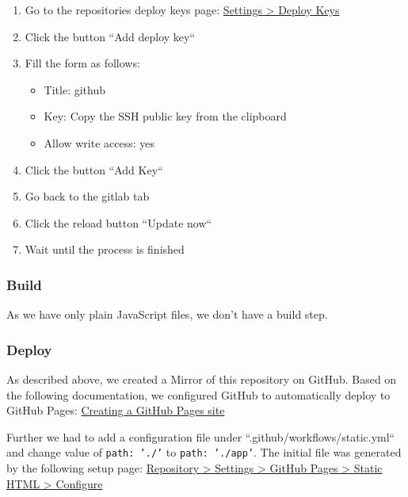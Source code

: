 \begin{enumerate}
    \item Go to the repositories deploy keys page: \href{https://github.com/decibel-threshold-event-displayer/decibel-threshold-event-displayer.github.io/settings/keys}{Settings > Deploy Keys}
    \item Click the button ``Add deploy key``
    \item Fill the form as follows:
          \begin{itemize}
              \item Title: github
              \item Key: Copy the SSH public key from the clipboard
              \item Allow write access: yes
          \end{itemize}
    \item Click the button ``Add Key``
    \item Go back to the gitlab tab
    \item Click the reload button ``Update now``
    \item Wait until the process is finished
\end{enumerate}

\subsubsection{Build}
As we have only plain JavaScript files, we don't have a build step.

\subsubsection{Deploy}
As described above, we created a Mirror of this repository on GitHub.
Based on the following documentation, we configured GitHub to automatically deploy to GitHub Pages:
\href{https://docs.github.com/en/pages/getting-started-with-github-pages/creating-a-github-pages-site}{Creating a GitHub Pages site}

Further we had to add a configuration file under ``.github/workflows/static.yml`` and change value of \texttt{path: './'} to \texttt{path: './app'}.
The initial file was generated by the following setup page:
\href{https://github.com/decibel-threshold-event-displayer/decibel-threshold-event-displayer.github.io/new/main?filename=.github%2Fworkflows%2Fstatic.yml&pages_workflow_template=pages%2Fstatic}{Repository > Settings > GitHub Pages > Static HTML > Configure}

